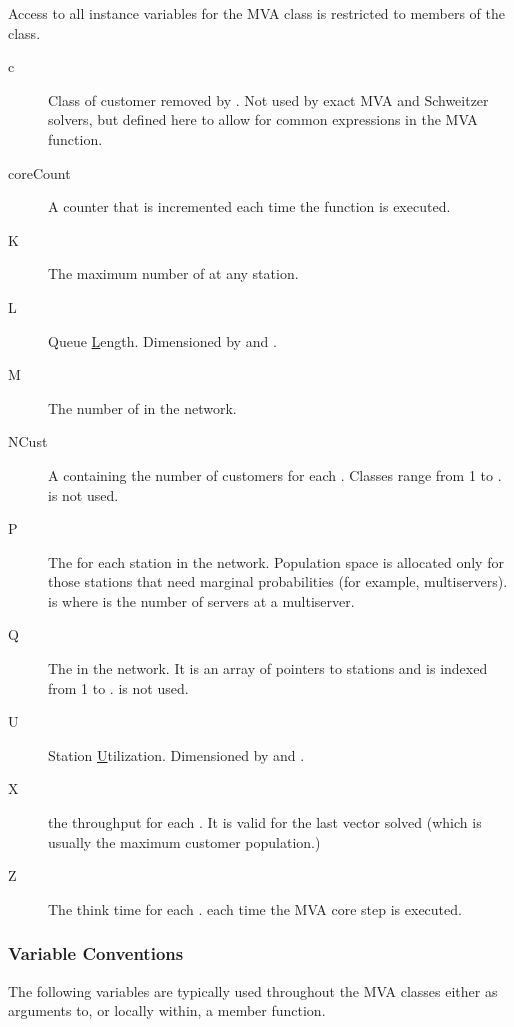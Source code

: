 Access to all instance variables for the MVA class is restricted to
members of the class.  
\begin{description}
\item[c] \texonly{---} Class of customer removed by
  .  Not used by exact MVA and
  Schweitzer solvers, but defined here to allow for common expressions
  in the MVA  function.
\item[coreCount] \texonly{---} A counter that is incremented each time
  the  function is executed.
\item[K] \texonly{---} The maximum number of  at any station.
\item[L] \texonly{---} Queue \underline{L}ength.  Dimensioned by  and .
\item[M] \texonly{---} The number of  in the network.
\item[NCust] \texonly{---} A  containing the number of
  customers for each .  Classes range from 1 to .
   is not used.
\item[P] \texonly{---} The  for each station in the network.
  Population space is allocated only for those stations that need
  marginal probabilities (for example, multiservers).  
   is  where  is the number of
  servers at a multiserver.
\item[Q] \texonly{---} The  in the network.  It is an
  array of pointers to stations and is indexed from 1 to .
   is not used.  
\item[U] \texonly{---} Station \underline{U}tilization.  Dimensioned by 
  and . 
\item[X] \texonly{---} the throughput for each .  It is
  valid for the last  vector solved
  (which is usually the maximum customer population.)
\item[Z] \texonly{---} The think time for each .
each time the MVA core step is executed.
\end{description}

\subsubsection{Variable Conventions}
The following variables are typically used throughout the MVA classes
either as arguments to, or locally within, a member function.

